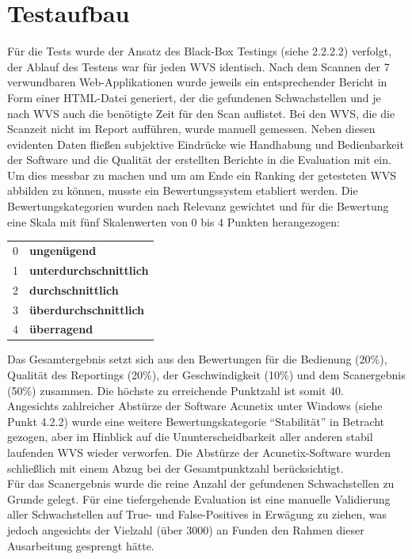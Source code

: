 \documentclass[12pt,oneside,a4paper,parskip,pointlessnumbers]{scrbook}
\begin{document}
  \section{Testaufbau}
  Für die Tests wurde der Ansatz des Black-Box Testings (siehe 2.2.2.2) verfolgt, der Ablauf des Testens war für jeden WVS identisch.
  Nach dem Scannen der 7 verwundbaren Web-Applikationen wurde jeweils ein entsprechender Bericht in Form einer HTML-Datei generiert, der die gefundenen Schwachstellen und je nach WVS auch die benötigte Zeit für den Scan auflistet. Bei den WVS, die die Scanzeit nicht im Report aufführen, wurde manuell gemessen.
  Neben diesen evidenten Daten fließen subjektive Eindrücke wie Handhabung und Bedienbarkeit der Software und die Qualität der erstellten Berichte in die Evaluation mit ein.\\
  Um dies messbar zu machen und um am Ende ein Ranking der getesteten WVS abbilden zu können, musste ein Bewertungssystem etabliert werden. Die Bewertungskategorien wurden nach Relevanz gewichtet und für die Bewertung eine Skala mit fünf Skalenwerten von 0 bis 4 Punkten herangezogen:
  \begin{table}[H]
     \begin{tabular}{ll}
     0         & \textbf{ungenügend}             \\
     1         & \textbf{unterdurchschnittlich}  \\
     2         & \textbf{durchschnittlich}       \\
     3         & \textbf{überdurchschnittlich}   \\
     4         & \textbf{überragend}
     \end{tabular}
   \end{table}
   Das Gesamtergebnis setzt sich aus den Bewertungen für die Bedienung (20\%), Qualität des Reportings (20\%), der Geschwindigkeit (10\%) und dem Scanergebnis (50\%) zusammen. Die höchste zu erreichende Punktzahl ist somit 40.\\
   Angesichts zahlreicher Abstürze der Software Acunetix unter Windows (siehe Punkt 4.2.2) wurde eine weitere Bewertungskategorie ``Stabilität'' in Betracht gezogen, aber im Hinblick auf die Ununterscheidbarkeit aller anderen stabil laufenden WVS wieder verworfen. Die Abstürze der Acunetix-Software wurden schließlich mit einem Abzug bei der Gesamtpunktzahl berücksichtigt.\\
   Für das Scanergebnis wurde die reine Anzahl der gefundenen Schwachstellen zu Grunde gelegt. Für eine tiefergehende Evaluation ist eine manuelle Validierung aller Schwachstellen auf True- und False-Positives in Erwägung zu ziehen, was jedoch angesichts der Vielzahl (über 3000) an Funden den Rahmen dieser Ausarbeitung gesprengt hätte.
\end{document}
